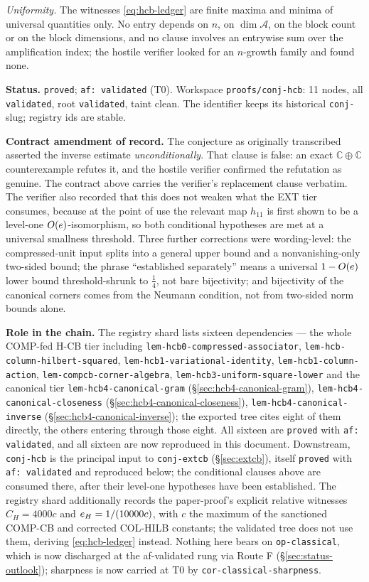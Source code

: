 \emph{Uniformity.} The witnesses \eqref{eq:hcb-ledger} are finite maxima and minima of
universal quantities only. No entry depends on $n$, on $\dim\mathcal A$, on the block
count or on the block dimensions, and no clause involves an entrywise sum over the
amplification index; the hostile verifier looked for an $n$-growth family and found none.

\medskip
\noindent\textbf{Status.} \texttt{proved}; \texttt{af: validated} (T0). Workspace
\texttt{proofs/conj-hcb}: 11 nodes, all \texttt{validated}, root \texttt{validated}, taint
clean. The identifier keeps its historical \texttt{conj-} slug; registry ids are stable.

\noindent\textbf{Contract amendment of record.} The conjecture as originally transcribed
asserted the inverse estimate \emph{unconditionally}. That clause is false: an exact
$\mathbb C\oplus\mathbb C$ counterexample refutes it, and the hostile verifier confirmed
the refutation as genuine. The contract above carries the verifier's replacement clause
verbatim. The verifier also recorded that this does not weaken what the EXT tier
consumes, because at the point of use the relevant map $h_{11}$ is first shown to be a
level-one $O(e)$-isomorphism, so both conditional hypotheses are met at a universal
smallness threshold. Three further corrections were wording-level: the compressed-unit
input splits into a general upper bound and a nonvanishing-only two-sided bound; the
phrase ``established separately'' means a universal $1-O(e)$ lower bound
threshold-shrunk to $\tfrac14$, not bare bijectivity; and bijectivity of the canonical
corners comes from the Neumann condition, not from two-sided norm bounds alone.

\noindent\textbf{Role in the chain.} The registry shard lists sixteen dependencies --- the
whole COMP-fed H-CB tier including \texttt{lem-hcb0-compressed-associator},
\texttt{lem-hcb-column-hilbert-squared}, \texttt{lem-hcb1-variational-identity},
\texttt{lem-hcb1-column-action}, \texttt{lem-compcb-corner-algebra},
\texttt{lem-hcb3-uniform-square-lower} and the canonical tier
\texttt{lem-hcb4-canonical-gram} (\S\ref{sec:hcb4-canonical-gram}),
\texttt{lem-hcb4-canonical-closeness} (\S\ref{sec:hcb4-canonical-closeness}),
\texttt{lem-hcb4-canonical-inverse} (\S\ref{sec:hcb4-canonical-inverse}); the exported
tree cites eight of them directly, the others entering through those eight. All sixteen
are \texttt{proved} with \texttt{af: validated}, and all sixteen are now reproduced in
this document. Downstream, \texttt{conj-hcb} is the principal input to
\texttt{conj-extcb} (\S\ref{sec:extcb}), itself \texttt{proved} with
\texttt{af: validated} and reproduced below; the conditional clauses above are consumed
there, after their level-one hypotheses have been established. The registry shard
additionally records the paper-proof's
explicit relative witnesses $C_H=4000c$ and $e_H=1/(10000c)$, with $c$ the maximum of
the sanctioned COMP-CB and corrected COL-HILB constants; the validated tree does not use
them, deriving \eqref{eq:hcb-ledger} instead. Nothing here bears on \texttt{op-classical}, which is now discharged at the af-validated rung via Route F (\S\ref{sec:status-outlook}); sharpness is now carried at T0 by \texttt{cor-classical-sharpness}.
